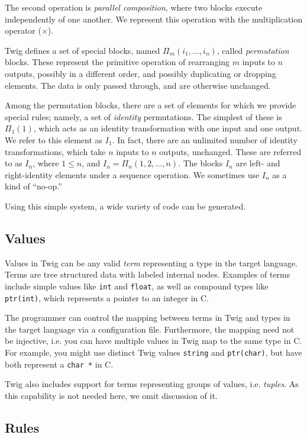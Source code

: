 The second operation is \emph{parallel composition}, where two blocks execute
independently of one another. We represent this operation with the
multiplication operator ($\times$).

Twig defines a set of special blocks, named $\Pi_m(i_1,\ldots,i_n)$, called
\emph{permutation} blocks. These represent the primitive operation of
rearranging $m$ inputs to $n$ outputs, possibly in a different order, and
possibly duplicating or dropping elements. The data is only passed through, and
are otherwise unchanged.

Among the permutation blocks, there are a set of elements for which we provide
special rules; namely, a set of \emph{identity} permutations. The simplest of
these is $\Pi_1(1)$, which acts as an identity transformation with one input and
one output. We refer to this element as $I_1$. In fact, there are an unlimited
number of identity transformations, which take $n$ inputs to $n$ outputs,
unchanged. These are referred to as $I_n$, where $1 \leq n$, and $I_n =
\Pi_n(1,2,\ldots,n)$. The blocks $I_n$ are left- and right-identity elements
under a sequence operation. We sometimes use $I_n$ as a kind of ``no-op.''

Using this simple system, a wide variety of code can be generated.


\subsection{Values}

Values in Twig can be any valid \emph{term} representing a type in the target
language. Terms are tree structured data with labeled internal nodes. Examples
of terms include simple values like \texttt{int} and \texttt{float}, as well as
compound types like \texttt{ptr(int)}, which represents a pointer to an integer
in C.

The programmer can control the mapping between terms in Twig and types in the
target language via a configuration file. Furthermore, the mapping need not be
injective, i.e. you can have multiple values in Twig map to the same type in C.
For example, you might use distinct Twig values \texttt{string} and
\texttt{ptr(char)}, but have both represent a \texttt{char *} in C.

Twig also includes support for terms representing groups of values, i.e.
\emph{tuples}. As this capability is not needed here, we omit discussion of it.

\subsection{Rules}

